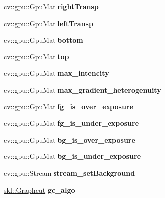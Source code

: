 \begin{DoxyCompactItemize}
cv\+::gpu\+::\+Gpu\+Mat {\bfseries right\+Transp}
\item 
\hypertarget{classskl_1_1gpu_1_1_tex_cut_a50b9c7cb1cd48b7f0234a5fbdd34acf8}{}\label{classskl_1_1gpu_1_1_tex_cut_a50b9c7cb1cd48b7f0234a5fbdd34acf8} 
cv\+::gpu\+::\+Gpu\+Mat {\bfseries left\+Transp}
\item 
\hypertarget{classskl_1_1gpu_1_1_tex_cut_a8503ba5ccc4930542e8c038296d87ee2}{}\label{classskl_1_1gpu_1_1_tex_cut_a8503ba5ccc4930542e8c038296d87ee2} 
cv\+::gpu\+::\+Gpu\+Mat {\bfseries bottom}
\item 
\hypertarget{classskl_1_1gpu_1_1_tex_cut_a7ab4d9bf13da0ec674242b02b98c20b9}{}\label{classskl_1_1gpu_1_1_tex_cut_a7ab4d9bf13da0ec674242b02b98c20b9} 
cv\+::gpu\+::\+Gpu\+Mat {\bfseries top}
\item 
\hypertarget{classskl_1_1gpu_1_1_tex_cut_af4742375eb1b7e571a63c12c6cd0014d}{}\label{classskl_1_1gpu_1_1_tex_cut_af4742375eb1b7e571a63c12c6cd0014d} 
cv\+::gpu\+::\+Gpu\+Mat {\bfseries max\+\_\+intencity}
\item 
\hypertarget{classskl_1_1gpu_1_1_tex_cut_a924fd90150dd032ef30bf5e2f87a7322}{}\label{classskl_1_1gpu_1_1_tex_cut_a924fd90150dd032ef30bf5e2f87a7322} 
cv\+::gpu\+::\+Gpu\+Mat {\bfseries max\+\_\+gradient\+\_\+heterogenuity}
\item 
\hypertarget{classskl_1_1gpu_1_1_tex_cut_a7516fe05b68bd8616dd59c0bf7e315d6}{}\label{classskl_1_1gpu_1_1_tex_cut_a7516fe05b68bd8616dd59c0bf7e315d6} 
cv\+::gpu\+::\+Gpu\+Mat {\bfseries fg\+\_\+is\+\_\+over\+\_\+exposure}
\item 
\hypertarget{classskl_1_1gpu_1_1_tex_cut_ac4e23a172d72bc2a41871dc60ada9bba}{}\label{classskl_1_1gpu_1_1_tex_cut_ac4e23a172d72bc2a41871dc60ada9bba} 
cv\+::gpu\+::\+Gpu\+Mat {\bfseries fg\+\_\+is\+\_\+under\+\_\+exposure}
\item 
\hypertarget{classskl_1_1gpu_1_1_tex_cut_abee8e25ec391a878ca9a054665f81751}{}\label{classskl_1_1gpu_1_1_tex_cut_abee8e25ec391a878ca9a054665f81751} 
cv\+::gpu\+::\+Gpu\+Mat {\bfseries bg\+\_\+is\+\_\+over\+\_\+exposure}
\item 
\hypertarget{classskl_1_1gpu_1_1_tex_cut_acacd3700554f2cdee01512ec48833c9e}{}\label{classskl_1_1gpu_1_1_tex_cut_acacd3700554f2cdee01512ec48833c9e} 
cv\+::gpu\+::\+Gpu\+Mat {\bfseries bg\+\_\+is\+\_\+under\+\_\+exposure}
\item 
\hypertarget{classskl_1_1gpu_1_1_tex_cut_a8f8005dc8398031a8f01e3034a8470b6}{}\label{classskl_1_1gpu_1_1_tex_cut_a8f8005dc8398031a8f01e3034a8470b6} 
cv\+::gpu\+::\+Stream {\bfseries stream\+\_\+set\+Background}
\item 
\hypertarget{classskl_1_1gpu_1_1_tex_cut_a6d47a2588356abb2567a91368e857ec4}{}\label{classskl_1_1gpu_1_1_tex_cut_a6d47a2588356abb2567a91368e857ec4} 
\hyperlink{classskl_1_1_graphcut}{skl\+::\+Graphcut} {\bfseries gc\+\_\+algo}
\end{DoxyCompactItemize}


